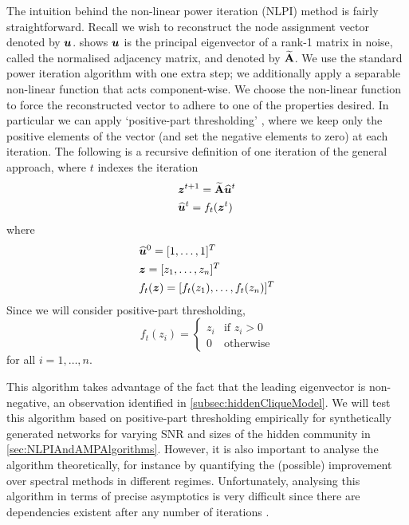 The intuition behind the non-linear power iteration (NLPI) method is fairly straightforward.
Recall we wish to reconstruct the node assignment vector denoted by $\vecvar{u}$.  shows $\vecvar{u}$ is the principal eigenvector of a rank-1 matrix in noise, called the normalised adjacency matrix, and denoted by $\widetilde{\mathbf A}$.
We use the standard power iteration algorithm with one extra step; we additionally apply a separable non-linear function that acts component-wise.
We choose the non-linear function to force the reconstructed vector to adhere to one of the properties desired. In particular we can apply `positive-part thresholding' \cite{Mon13}, where we keep only the positive elements of the vector (and set the negative elements to zero) at each iteration.
The following is a recursive definition of one iteration of the general approach, where $t$ indexes the iteration
\begin{equation}
	\label{eq:NLPIAlgorithm}
	\begin{split}
		&\vecvar{z}^{t+1} = \widetilde{\matvar{A}} \widehat{\vecvar{u}}^{t} \\
		&\widehat{\vecvar{u}}^{t} = f_{t}(\vecvar{z}^{t})
	\end{split}
\end{equation}
where
\begin{equation}
	\label{eq:NLPIAlgorithmConditions}
	\begin{split}
		&\widehat{\vecvar{u}}^{0} = \transpose{[1,\dots,1]} \\
		&\vecvar{z} = \transpose{[z_{1},\dots,z_{n}]} \\
		&f_{t}(\vecvar{z}) = \transpose{[f_{t}(z_{1}),\dots,f_{t}(z_{n})]}
	\end{split}
\end{equation}
Since we will consider positive-part thresholding,
\begin{equation}
	\label{eq:NLPIAlgorithmThresholding}
	f_{t}(z_{i}) =
	\begin{cases}
		z_{i}& \text{if } z_{i} > 0\\
		0 & \text{otherwise}
	\end{cases}
\end{equation}
for all $i=1,\dots,n$.

This algorithm takes advantage of the fact that the leading eigenvector is non-negative, an observation identified in \cref{subsec:hiddenCliqueModel}.
We will test this algorithm based on positive-part thresholding empirically for synthetically generated networks for varying SNR and sizes of the hidden community in \cref{sec:NLPIAndAMPAlgorithms}.
However, it is also important to analyse the algorithm theoretically, for instance by quantifying the (possible) improvement over spectral methods in different regimes.
Unfortunately, analysing this algorithm in terms of precise asymptotics is very difficult since there are dependencies existent after any number of iterations \cite{Mon13}.

